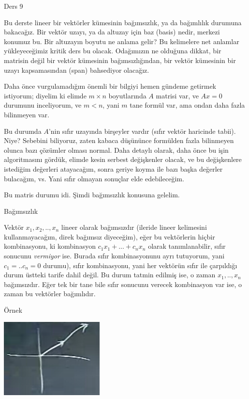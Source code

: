 \documentclass[12pt,fleqn]{article}\usepackage{../../common}
\begin{document}
Ders 9

Bu derste lineer bir vektörler kümesinin bağımsızlık, ya da bağımlılık
durumuna bakacağız. Bir vektör uzayı, ya da altuzay için baz (basis) nedir,
merkezi konumuz bu. Bir altuzayın boyutu ne anlama gelir? Bu kelimelere net
anlamlar yükleyeceğimiz kritik ders bu olacak. Odağımızın ne olduğuna
dikkat, bir matrisin değil bir vektör kümesinin bağımsızlığından, bir
vektör kümesinin bir uzayı kapsamasından (span) bahsediyor olacağız. 

Daha önce vurgulamadığım önemli bir bilgiyi hemen gündeme getirmek
istiyorum; diyelim ki elimde $m \times n$ boyutlarında $A$ matrisi var, ve
$Ax=0$ durumunu inceliyorum, ve $m < n$, yani $m$ tane formül var, ama
ondan daha fazla bilinmeyen var. 

Bu durumda $A$'nin sıfır uzayında birşeyler vardır (sıfır vektör haricinde
tabii). Niye? Sebebini biliyoruz, zaten kabaca düşününce formülden fazla
bilinmeyen olunca bazı çözümler olması normal. Daha detaylı olarak, daha
önce bu işin algoritmasını gördük, elimde kesin serbest değişkenler olacak,
ve bu değişkenlere istediğim değerleri atayacağım, sonra geriye koyma ile
bazı başka değerler bulacağım, vs. Yani sıfır olmayan sonuçlar elde
edebileceğim. 

Bu matris durumu idi. Şimdi bağımsızlık konusuna gelelim. 

Bağımsızlık

Vektör $x_1,x_2,..,x_n$ lineer olarak bağımsızdır (ileride lineer
kelimesini kullanmayacağım, direk bağımsız diyeceğim), eğer bu vektörlerin
hiçbir kombinasyonu, ki kombinasyon $c_1x_1+...+c_nx_n$ olarak
tanımlanabilir, sıfır sonucunu {\em vermiyor} ise. Burada sıfır
kombinasyonunu ayrı tutuyorum, yani $c_1=..c_n=0$ durumu), sıfır
kombinasyonu, yani her vektörün sıfır ile çarpıldığı durum üstteki tarife
dahil değil. Bu durum tatmin edilmiş ise, o zaman $x_1,..,x_n$
bağımsızdır. Eğer tek bir tane bile sıfır sonucunu verecek kombinasyon var
ise, o zaman bu vektörler bağımlıdır.

Örnek

\includegraphics[height=4cm]{9_01.png}
\end{document}

